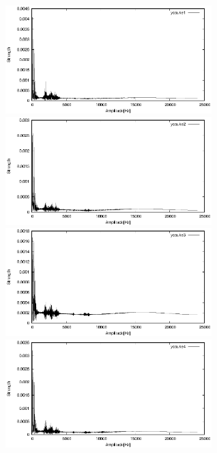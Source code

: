 \documentclass[titlepage]{jarticle}
\begin{document}
\begin{figure}[H]
  \begin{minipage}{0.495\hsize}
    \centering
    \includegraphics[width=8cm]{img/yosuke1.eps}
    \caption{}
    \label{yosuke1}
  \end{minipage}
  \begin{minipage}{0.495\hsize}
    \centering
    \includegraphics[width=8cm]{img/yosuke2.eps}
    \caption{}
    \label{yosuke2}
  \end{minipage}


  \begin{minipage}{0.495\hsize}
    \centering
    \includegraphics[width=8cm]{img/yosuke3.eps}
    \caption{}
    \label{yosuke3}
  \end{minipage}
  \begin{minipage}{0.495\hsize}
    \centering
    \includegraphics[width=8cm]{img/yosuke4.eps}
    \caption{}
    \label{yosuke4}
  \end{minipage}
\end{figure}
\end{document}
